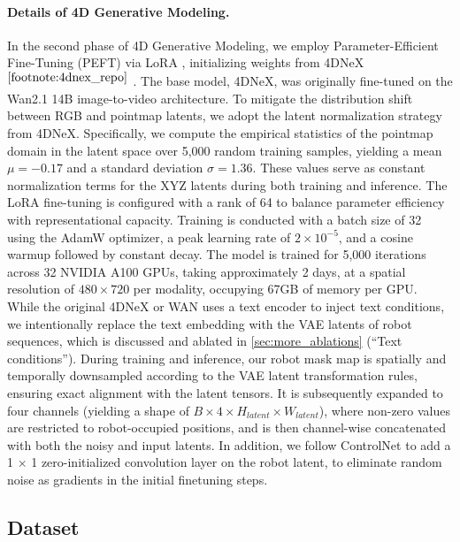 \begin{appendices}
\paragraph{Details of 4D Generative Modeling.} 
In the second phase of 4D Generative Modeling, we employ Parameter-Efficient Fine-Tuning (PEFT) via LoRA \cite{hu2022lora}, initializing weights from 4DNeX$^{\ref{footnote:4dnex_repo}}$ \cite{chen20254dnex}.
The base model, 4DNeX, was originally fine-tuned on the Wan2.1 \cite{wan2025wan} 14B image-to-video architecture. To mitigate the distribution shift between RGB and pointmap latents, we adopt the latent normalization strategy from 4DNeX. Specifically, we compute the empirical statistics of the pointmap domain in the latent space over 5,000 random training samples, yielding a mean $\mu = -0.17$ and a standard deviation $\sigma = 1.36$. These values serve as constant normalization terms for the XYZ latents during both training and inference. The LoRA fine-tuning is configured with a rank of 64 to balance parameter efficiency with representational capacity. Training is conducted with a batch size of 32 using the AdamW optimizer, a peak learning rate of $2 \times 10^{-5}$, and a cosine warmup followed by constant decay. The model is trained for 5,000 iterations across 32 NVIDIA A100 GPUs, taking approximately 2 days, at a spatial resolution of $480 \times 720$ per modality, occupying 67GB of memory per GPU. While the original 4DNeX or WAN uses a text encoder to inject text conditions, we intentionally replace the text embedding with the VAE latents of robot sequences, which is discussed and ablated in \cref{sec:more_ablations} (“Text conditions”).
During training and inference, our robot mask map is spatially and temporally downsampled according to the VAE latent transformation rules, ensuring exact alignment with the latent tensors. It is subsequently expanded to four channels (yielding a shape of $B \times 4 \times H_{latent} \times W_{latent}$), where non-zero values are restricted to robot-occupied positions, and is then channel-wise concatenated with both the noisy and input latents. In addition, we follow ControlNet \cite{zhang2023adding} to add a 1 × 1 zero-initialized convolution layer on the robot latent, to eliminate random noise as gradients in the initial finetuning steps.

\subsection{Dataset}

\end{appendices}

